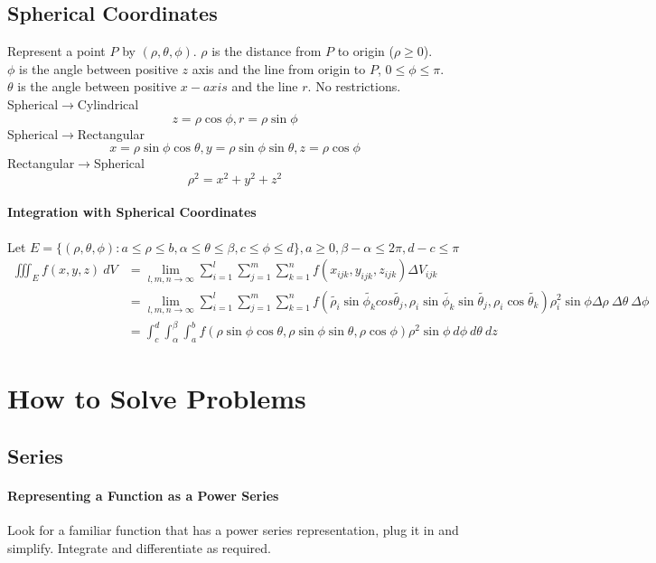 \documentclass[12 pt]{article}
\theoremstyle{definition}
\begin{document}
\subsection{Spherical Coordinates} Represent a point $P$ by $(\rho,\theta,\phi)$. $\rho$ is the distance from $P$ to origin ($\rho \geq 0$).
\\$\phi$ is the angle between positive $z$ axis and the line from origin to $P$, $0\leq \phi \leq \pi$.
\\$\theta$ is the angle between positive $x-axis$ and the line $r$. No restrictions.
\\ Spherical$\to$Cylindrical
$$z=\rho \cos \phi, r=\rho \sin \phi$$
Spherical$\to$Rectangular
$$x=\rho \sin\phi \cos\theta,y=\rho\sin\phi\sin\theta,z=\rho\cos\phi$$
Rectangular$\to$Spherical
$$\rho^2=x^2+y^2+z^2$$
\paragraph{Integration with Spherical Coordinates}
Let $E=\{(\rho,\theta,\phi):a\leq\rho\leq b, \alpha \leq \theta \leq \beta, c \leq \phi \leq d\}, a\geq 0, \beta-\alpha \leq 2\pi, d-c \leq \pi$
\begin{align*}
  \iiint_{E}f(x,y,z)\ dV &= \lim_{l,m,n\to \infty}\sum_{i=1}^l \sum_{j=1}^m \sum_{k=1}^n f(x_{ijk},y_{ijk},z_{ijk})\Delta V_{ijk}
  \\&=\lim_{l,m,n\to \infty}\sum_{i=1}^{l}\sum_{j=1}^m \sum_{k=1}^n f(\widetilde{\rho_i}\sin\widetilde{\phi_k}cos\widetilde{\theta_j},\rho_i\sin\widetilde{\phi_k}\sin\widetilde{\theta_j},\rho_i\cos\widetilde{\theta_k})\rho_i^2 \sin \phi \Delta\rho \ \Delta \theta \ \Delta\phi
      \\&=\int_c^d\int_\alpha^{\beta}\int_a^b f(\rho \sin \phi \cos \theta,\rho \sin\phi \sin \theta,\rho \cos \phi)\rho^2 \sin \phi \ d\phi \ d\theta \ dz
\end{align*}
\section{How to Solve Problems}
\subsection{Series}
\paragraph{Representing a Function as a Power Series} Look for a familiar function that has a power series representation, plug it in and simplify. Integrate and differentiate as required.
\end{document}
